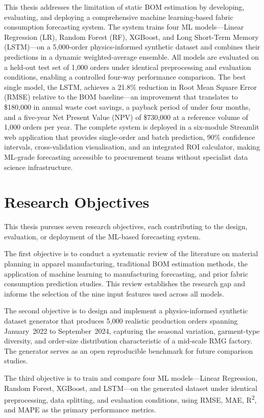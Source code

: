 This thesis addresses the limitation of static BOM estimation by developing, evaluating, and deploying a comprehensive machine learning-based fabric consumption forecasting system. The system trains four ML models---Linear Regression (LR), Random Forest (RF), XGBoost, and Long Short-Term Memory (LSTM)---on a 5{,}000-order physics-informed synthetic dataset and combines their predictions in a dynamic weighted-average ensemble. All models are evaluated on a held-out test set of 1{,}000 orders under identical preprocessing and evaluation conditions, enabling a controlled four-way performance comparison. The best single model, the LSTM, achieves a 21.8\% reduction in Root Mean Square Error (RMSE) relative to the BOM baseline---an improvement that translates to \$180{,}000 in annual waste cost savings, a payback period of under four months, and a five-year Net Present Value (NPV) of \$730{,}000 at a reference volume of 1{,}000 orders per year. The complete system is deployed in a six-module Streamlit web application that provides single-order and batch prediction, 90\% confidence intervals, cross-validation visualisation, and an integrated ROI calculator, making ML-grade forecasting accessible to procurement teams without specialist data science infrastructure.

\secdiv
\section{Research Objectives}
This thesis pursues seven research objectives, each contributing to the design, evaluation, or deployment of the ML-based forecasting system.

The first objective is to conduct a systematic review of the literature on material planning in apparel manufacturing, traditional BOM estimation methods, the application of machine learning to manufacturing forecasting, and prior fabric consumption prediction studies. This review establishes the research gap and informs the selection of the nine input features used across all models.

The second objective is to design and implement a physics-informed synthetic dataset generator that produces 5{,}000 realistic production orders spanning January~2022 to September~2024, capturing the seasonal variation, garment-type diversity, and order-size distribution characteristic of a mid-scale RMG factory. The generator serves as an open reproducible benchmark for future comparison studies.

The third objective is to train and compare four ML models---Linear Regression, Random Forest, XGBoost, and LSTM---on the generated dataset under identical preprocessing, data splitting, and evaluation conditions, using RMSE, MAE, R\textsuperscript{2}, and MAPE as the primary performance metrics.

